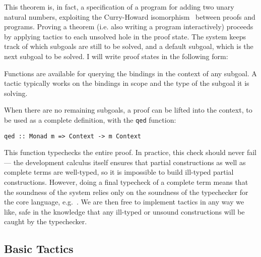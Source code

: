 This theorem is, in fact, a specification of a program for adding two
unary natural numbers, exploiting the Curry-Howard
isomorphism~\cite{curry-feys,howard} between proofs and programs.
Proving a theorem (i.e. also writing a program interactively) proceeds by
applying tactics to each unsolved hole in the proof state. The system
keeps track of which subgoals are still to be solved, and a default
subgoal, which is the next subgoal to be solved. I will write proof
states in the following form:


Functions are available for querying the bindings in the context of
any subgoal. A tactic typically works on the bindings in scope and the
type of the subgoal it is solving.

When there are no remaining subgoals, a proof can be lifted into the
context, to be used as a complete definition, with the \texttt{qed}
function:

\begin{verbatim}
qed :: Monad m => Context -> m Context
\end{verbatim}

This function typechecks the entire proof. In practice, this check
should never fail --- the development calculus itself ensures that
partial constructions as well as complete terms are well-typed, so it
is impossible to build ill-typed partial constructions. However, doing
a final typecheck of a complete term means that the soundness of the
system relies only on the soundness of the typechecker for the core
language, e.g.~\cite{coq-in-coq}.  We are then free to implement tactics
in any way we like, safe in the knowledge that any ill-typed or
unsound constructions will be caught by the typechecker.


\subsection{Basic Tactics}

